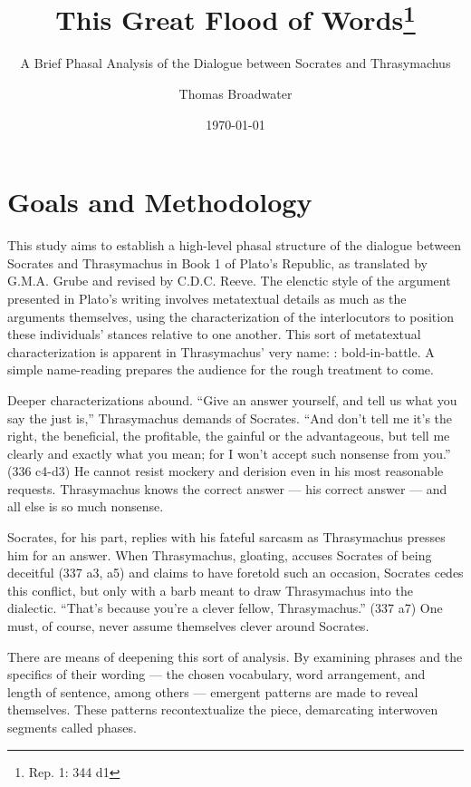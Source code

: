 \documentclass[noraggedright]{turabian-researchpaper}
\title{This Great Flood of Words\thanks{Rep. 1: 344 d1}}
\subtitle{A Brief Phasal Analysis of the Dialogue
  between Socrates and Thrasymachus}
\author{Thomas Broadwater}
\date{\today}
\begin{document}







\maketitle

\section{Goals and Methodology}
This study aims to establish a high-level phasal structure of the dialogue
between Socrates and Thrasymachus in Book 1 of Plato's Republic, as
translated by G.M.A. Grube and revised by C.D.C. Reeve. The elenctic style
of the argument presented in Plato's writing involves metatextual details as
much as the arguments themselves, using the characterization of the
interlocutors to position these individuals' stances relative to one another.
This sort of metatextual characterization is apparent in Thrasymachus' very
name: : bold-in-battle.%
\autocite[s.v. , ; cf. Ther. )]{Brill}
A simple name-reading prepares the audience for the rough treatment to come.

Deeper characterizations abound. ``Give an answer yourself, and tell us what you
say the just is,'' Thrasymachus demands of Socrates. ``And don't tell me it's
the right, the beneficial, the profitable, the gainful or the advantageous, but
tell me clearly and exactly what you mean; for I won't accept such nonsense from
you.'' (336 c4-d3) He cannot resist mockery and derision even in his most
reasonable requests. Thrasymachus knows the correct answer — his correct answer
— and all else is so much nonsense.

Socrates, for his part, replies with his fateful sarcasm as Thrasymachus 
presses him for an answer. When Thrasymachus, gloating, accuses Socrates of
being deceitful (337 a3, a5) and claims to have foretold such an occasion,
Socrates cedes this conflict, but only with a barb meant to draw Thrasymachus
into the dialectic. ``That's because you're a clever fellow, Thrasymachus.''
(337 a7) One must, of course, never assume themselves clever around Socrates.

\vspace*{1\baselineskip}
\noindent There are means of deepening this sort of analysis. By examining
phrases and the specifics of their wording — the chosen vocabulary, word
arrangement, and length of sentence, among others —  emergent patterns are made
to reveal themselves. These patterns recontextualize the piece, demarcating
interwoven segments called phases.
\end{document}
